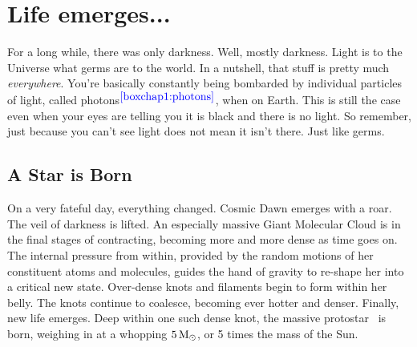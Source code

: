 \documentclass[main.tex]{subfiles}
\begin{document}
\chapter{Life emerges...}

\par \nar For a long while, there was only darkness.  Well, mostly darkness.  Light is to the Universe what germs are to the world.  In a nutshell, that stuff is pretty much \textit{everywhere}.  You're basically constantly being bombarded by individual particles of light, called photons$^{\textcolor{blue}{\ref{boxchap1:photons}}}$, when on Earth.  This is still the case even when your eyes are telling you it is black and there is no light.  So remember, just because you can't see light does not mean it isn't there.  Just like germs.


\section{A Star is Born} \label{born}

\par \nar On a very fateful day, everything changed.  Cosmic Dawn emerges with a roar.  The veil of darkness is lifted.  An especially massive Giant Molecular Cloud is in the final stages of contracting, becoming more and more dense as time goes on.  The internal pressure from within, provided by the random motions of her constituent atoms and molecules, guides the hand of gravity to re-shape her into a critical new state.  Over-dense knots and filaments begin to form within her belly.  The knots continue to coalesce, becoming ever hotter and denser.  Finally, new life emerges.  Deep within one such dense knot, the massive protostar \rmmaia~is born, weighing in at a whopping $5\,\mathrm{M}_\odot$, or 5 times the mass of the Sun.
\end{document}
